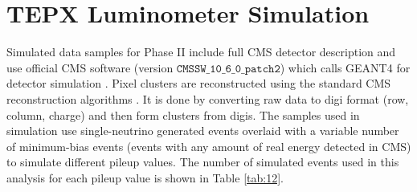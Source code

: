 


\section{TEPX Luminometer Simulation}

 Simulated data samples for Phase II include full CMS detector description and use official CMS software (version $\texttt{CMSSW\_10\_6\_0\_patch2}$) which calls GEANT4 for detector simulation \cite{GEANT4:2002zbu}.  Pixel clusters are reconstructed using the standard CMS reconstruction algorithms \cite{cmssw_2024}. It is done by converting raw data to digi format (row, column, charge) and then form clusters from digis. The samples used in simulation use single-neutrino generated events overlaid with a variable number of minimum-bias events (events with any amount of real energy detected in CMS) to simulate different pileup values.  The number of simulated events used in this analysis for each pileup value is shown in Table \ref{tab:12}.
 

